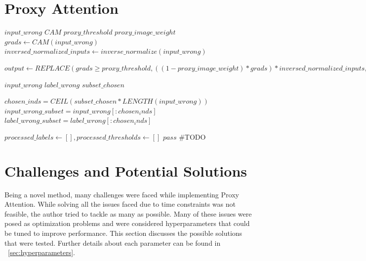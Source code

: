 \section{Proxy Attention}

\begin{algorithm}
    \caption{Single Batch Proxy Attention}
    \label{alg:proxy_attention_single_batch}
    \begin{algorithmic}
        \REQUIRE $input\_wrong$
        \REQUIRE $CAM$
        \REQUIRE $proxy\_threshold$
        \REQUIRE $proxy\_image\_weight$
        \STATE $grads \leftarrow CAM(input\_wrong)$
        \STATE $inversed\_normalized\_inputs \leftarrow inverse\_normalize(input\_wrong)$

        \STATE $output \leftarrow REPLACE(grads \geq proxy\_threshold, ((1- proxy\_image\_weight) * grads) * inversed\_normalized\_inputs, inversed\_normalized\_inputs)$
    \end{algorithmic}
\end{algorithm}


\begin{algorithm}
    \caption{Batch Proxy Attention}
    \label{alg:proxy_attention_batch}
    \begin{algorithmic}
        \REQUIRE $input\_wrong$
        \REQUIRE $label\_wrong$
        \REQUIRE $subset\_chosen$

        \STATE $chosen\_inds = CEIL(subset\_chosen * LENGTH(input\_wrong))$
        \STATE $input\_wrong\_subset = input\_wrong[:chosen_inds]$
        \STATE $label\_wrong\_subset = label\_wrong[:chosen_inds]$

        \STATE $processed\_labels \leftarrow [], processed\_thresholds \leftarrow []$
        \STATE $pass$ \#TODO
        \ENDFOR

    \end{algorithmic}
\end{algorithm}

\section{Challenges and Potential Solutions}
Being a novel method, many challenges were faced while implementing Proxy Attention. While solving all the issues faced due to time constraints was not feasible, the author tried to tackle as many as possible. Many of these issues were posed as optimization problems and were considered hyperparameters that could be tuned to improve performance. This section discusses the possible solutions that were tested. Further details about each parameter can be found in ~\ref{sec:hyperparameters}.

